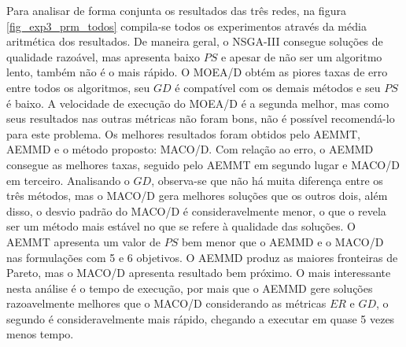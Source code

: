 Para analisar de forma conjunta os resultados das três redes, na figura \ref{fig_exp3_prm_todos} compila-se todos os experimentos através da média aritmética dos resultados. De maneira geral, o NSGA-III consegue soluções de qualidade razoável, mas apresenta baixo $PS$ e apesar de não ser um algoritmo lento, também não é o mais rápido. O MOEA/D obtém as piores taxas de erro entre todos os algoritmos, seu $GD$ é compatível com os demais métodos e seu $PS$ é baixo. A velocidade de execução do MOEA/D é a segunda melhor, mas como seus resultados nas outras métricas não foram bons, não é possível recomendá-lo para este problema. Os melhores resultados foram obtidos pelo AEMMT, AEMMD e o método proposto: MACO/D. Com relação ao erro, o AEMMD consegue as melhores taxas, seguido pelo AEMMT em segundo lugar e MACO/D em terceiro. Analisando o $GD$, observa-se que não há muita diferença entre os três métodos, mas o MACO/D gera melhores soluções que os outros dois, além disso, o desvio padrão do MACO/D é consideravelmente menor, o que o revela ser um método mais estável no que se refere à qualidade das soluções. O AEMMT apresenta um valor de $PS$ bem menor que o AEMMD e o MACO/D nas formulações com 5 e 6 objetivos. O AEMMD produz as maiores fronteiras de Pareto, mas o MACO/D apresenta resultado bem próximo. O mais interessante nesta análise é o tempo de execução, por mais que o AEMMD gere soluções razoavelmente melhores que o MACO/D considerando as métricas $ER$ e $GD$, o segundo é consideravelmente mais rápido, chegando a executar em quase 5 vezes menos tempo.

